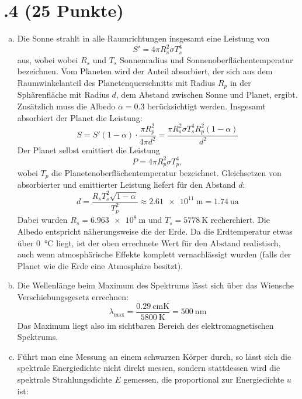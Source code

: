 \section*{\nr.4 \titfour (25 Punkte)}
\begin{enumerate}[(a)]
\item 
Die Sonne strahlt in alle Raumrichtungen insgesamt eine Leistung von
\begin{equation}
S' = 4\pi R_s^2\sigma T_s^4
\end{equation}
aus, wobei wobei $R_s$ und $T_s$ Sonnenradius und Sonnenoberflächentemperatur bezeichnen. Vom Planeten wird der Anteil absorbiert, der sich aus dem Raumwinkelanteil des Planetenquerschnitts mit Radius $R_p$ in der Sphärenfläche mit Radius $d$, dem Abstand zwischen Sonne und Planet, ergibt. Zusätzlich muss die Albedo $\alpha = \num{0.3}$ berücksichtigt werden. Insgesamt absorbiert der Planet die Leistung:
\begin{equation}
S = S'(1-\alpha) \cdot \frac{\pi R_p^2}{4\pi d^2} = \frac{\pi R_s^2\sigma T_s^4 R_p^2(1-\alpha)}{d^2}
\end{equation}
Der Planet selbst emittiert die Leistung
\begin{equation}
P = 4\pi R_p^2\sigma T_p^4,
\end{equation}
wobei $T_p$ die Planetenoberflächentemperatur bezeichnet. Gleichsetzen von absorbierter und emittierter Leistung liefert für den Abstand $d$:
\begin{equation}
d = \frac{R_s T_s^2 \sqrt{1-\alpha}}{T_p^2} \approx \SI{2.61e11}{\meter} = \SI{1.74}{\astronomicalunit}
\end{equation}
Dabei wurden $R_s = \SI{6.963e8}{\meter}$ und $T_s = \SI{5778}{\kelvin}$ recherchiert. Die Albedo entspricht näherungsweise die der Erde. Da die Erdtemperatur etwas über \SI{0}{\celsius} liegt, ist der oben errechnete Wert für den Abstand realistisch, auch wenn atmosphärische Effekte komplett vernachlässigt wurden (falls der Planet wie die Erde eine Atmosphäre besitzt).
\item 
Die Wellenlänge beim Maximum des Spektrums lässt sich über das Wiensche Verschiebungsgesetz errechnen:
\begin{equation}
\lambda_\text{max}= \frac{\SI{0.29}{\centi\meter\kelvin}}{\SI{5800}{\kelvin}}  = \SI{500}{\nano\meter}
\end{equation}
Das Maximum liegt also im sichtbaren Bereich des elektromagnetischen Spektrums.
\item
Führt man eine Messung an einem schwarzen Körper durch, so lässt sich die spektrale Energiedichte nicht direkt messen, sondern stattdessen wird die spektrale Strahlungsdichte $E$ gemessen, die proportional zur Energiedichte $u$ ist:

\end{enumerate}
